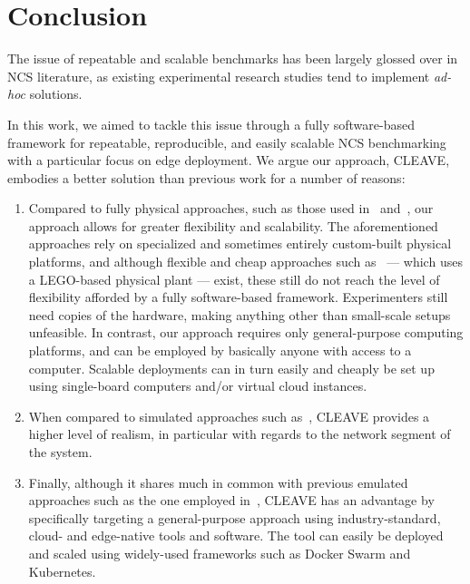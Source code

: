 \section{Conclusion}\label{paper:olguinmunoz2022cleave:conclusion}

The issue of repeatable and scalable benchmarks has been largely glossed over in \gls{NCS} literature, as existing experimental research studies tend to implement \emph{ad-hoc} solutions.

In this work, we aimed to tackle this issue through a fully software-based framework for repeatable, reproducible, and easily scalable \gls{NCS} benchmarking with a particular focus on edge deployment.
We argue our approach, \gls{CLEAVE}, embodies a better solution than previous work for a number of reasons:
\begin{enumerate}
    \item Compared to fully physical approaches, such as those used in\ \cite{baumann2018evaluating} and\ \cite{cuenca2019periodic}, our approach allows for greater flexibility and scalability.
    The aforementioned approaches rely on specialized and sometimes entirely custom-built physical platforms, and although flexible and cheap approaches such as\ \cite{zoppi2020ncsbench} --- which uses a LEGO-based physical plant --- exist, these still do not reach the level of flexibility afforded by a fully software-based framework.
    Experimenters still need copies of the hardware, making anything other than small-scale setups unfeasible.
    In contrast, our approach requires only general-purpose computing platforms, and can be employed by basically anyone with access to a computer.
    Scalable deployments can in turn easily and cheaply be set up using single-board computers and/or virtual cloud instances.
    \item When compared to simulated approaches such as\ \cite{ma2019optimal}, \gls{CLEAVE} provides a higher level of realism, in particular with regards to the network segment of the system.
    \item Finally, although it shares much in common with previous emulated approaches such as the one employed in\ \cite{wang2020inverter}, \gls{CLEAVE} has an advantage by specifically targeting a general-purpose approach using industry-standard, cloud- and edge-native tools and software.
    The tool can easily be deployed and scaled using widely-used frameworks such as Docker Swarm and Kubernetes.
\end{enumerate}

